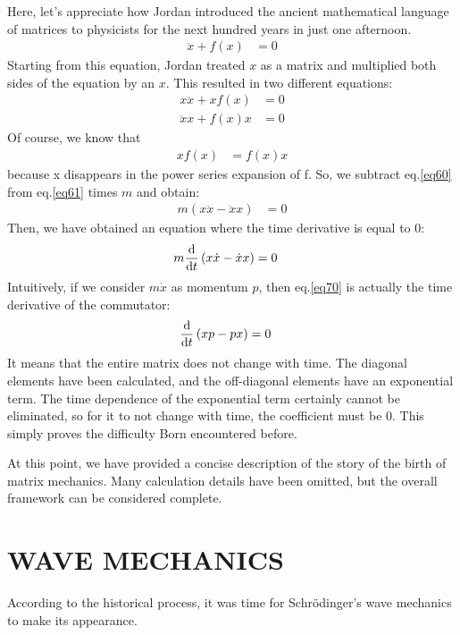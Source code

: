 \documentclass[a4paper, 12pt, oneside, onecolumn]{article}
\newcommand{\cald}{{\rm d}}
\begin{document}
\begin{multicols}{2}
Here, let's appreciate how Jordan introduced the ancient mathematical language of matrices to physicists for the next hundred years in just one afternoon.
\begin{align}
	\ddot x + f \left( x \right)
	&= 0
\end{align}
Starting from this equation, Jordan treated $x$ as a matrix and multiplied both sides of the equation by an $x$. This resulted in two different equations:
\begin{align}
	x \ddot x + x f \left( x \right)
	&= 0 \label{eq60} \\
	\ddot x x + f \left( x \right) x
	&= 0 \label{eq61}
\end{align}
Of course, we know that
\begin{align}
	x f \left( x \right)
	&= f \left( x \right) x
\end{align}
because x disappears in the power series expansion of f. So, we subtract eq.\ref{eq60} from eq.\ref{eq61} times $m$ and obtain:
\begin{align}
	m \left( x \ddot x - \ddot x x \right)
	&= 0
\end{align}
Then, we have obtained an equation where the time derivative is equal to $0$:
\begin{align}
	m \frac{\cald }{\cald t} \left( x \dot x - \dot x x \right)
	&= 0 \label{eq70}
\end{align}
Intuitively, if we consider $m \dot x$ as momentum $p$, then eq.\ref{eq70} is actually the time derivative of the commutator:
\begin{align}
	\frac{\cald }{\cald t} \left( x p - p x \right)
	&= 0
\end{align}
It means that the entire matrix does not change with time. The diagonal elements have been calculated, and the off-diagonal elements have an exponential term. The time dependence of the exponential term certainly cannot be eliminated, so for it to not change with time, the coefficient must be $0$. This simply proves the difficulty Born encountered before.

At this point, we have provided a concise description of the story of the birth of matrix mechanics. Many calculation details have been omitted, but the overall framework can be considered complete.
\section{WAVE MECHANICS}
According to the historical process, it was time for Schrödinger's wave mechanics to make its appearance. 


\end{multicols}
\end{document}
